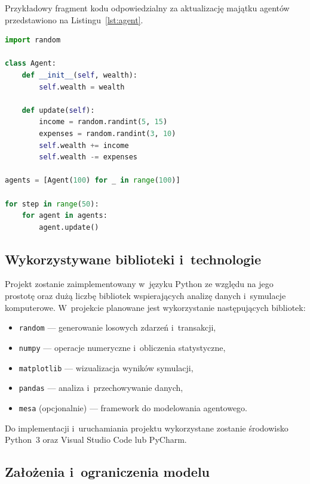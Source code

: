 \documentclass[polish]{projectreport}
\begin{document}
Przyk\l{}adowy fragment kodu odpowiedzialny za aktualizacj\k{e} maj\k{a}tku agent\'ow
przedstawiono na Listingu~\ref{lst:agent}.

\clearpage
\begin{lstlisting}[language=Python, caption={Fragment kodu symulacji agentowej}, label={lst:agent}]
import random

class Agent:
    def __init__(self, wealth):
        self.wealth = wealth

    def update(self):
        income = random.randint(5, 15)
        expenses = random.randint(3, 10)
        self.wealth += income
        self.wealth -= expenses

agents = [Agent(100) for _ in range(100)]

for step in range(50):
    for agent in agents:
        agent.update()
\end{lstlisting}

\subsection{Wykorzystywane biblioteki i~technologie}
\label{sec:tech}

Projekt zostanie zaimplementowany w~j\k{e}zyku Python ze wzgl\k{e}du na jego prostot\k{e}
oraz du\.{z}\k{a} liczb\k{e} bibliotek wspieraj\k{a}cych analiz\k{e} danych i~symulacje komputerowe.
W~projekcie planowane jest wykorzystanie nast\k{e}puj\k{a}cych bibliotek:
\begin{itemize}
  \item \texttt{random} --- generowanie losowych zdarze\'n i~transakcji,
  \item \texttt{numpy} --- operacje numeryczne i~obliczenia statystyczne,
  \item \texttt{matplotlib} --- wizualizacja wynik\'ow symulacji,
  \item \texttt{pandas} --- analiza i~przechowywanie danych,
  \item \texttt{mesa} (opcjonalnie) --- framework do modelowania agentowego.
\end{itemize}

Do implementacji i~uruchamiania projektu wykorzystane zostanie \'srodowisko Python~3
oraz Visual Studio Code lub PyCharm.

\subsection{Za\l{}o\.{z}enia i~ograniczenia modelu}
\label{sec:limitations}
\end{document}
